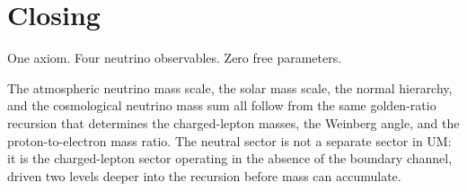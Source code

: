 \documentclass[12pt]{article}
\begin{document}
\section*{Closing}

One axiom.  Four neutrino observables.  Zero free parameters.

The atmospheric neutrino mass scale, the solar mass scale, the
normal hierarchy, and the cosmological neutrino mass sum all follow
from the same golden-ratio recursion that determines the charged-lepton
masses, the Weinberg angle, and the proton-to-electron mass ratio.
The neutral sector is not a separate sector in UM: it is the
charged-lepton sector operating in the absence of the boundary channel,
driven two levels deeper into the recursion before mass can accumulate.
\end{document}
